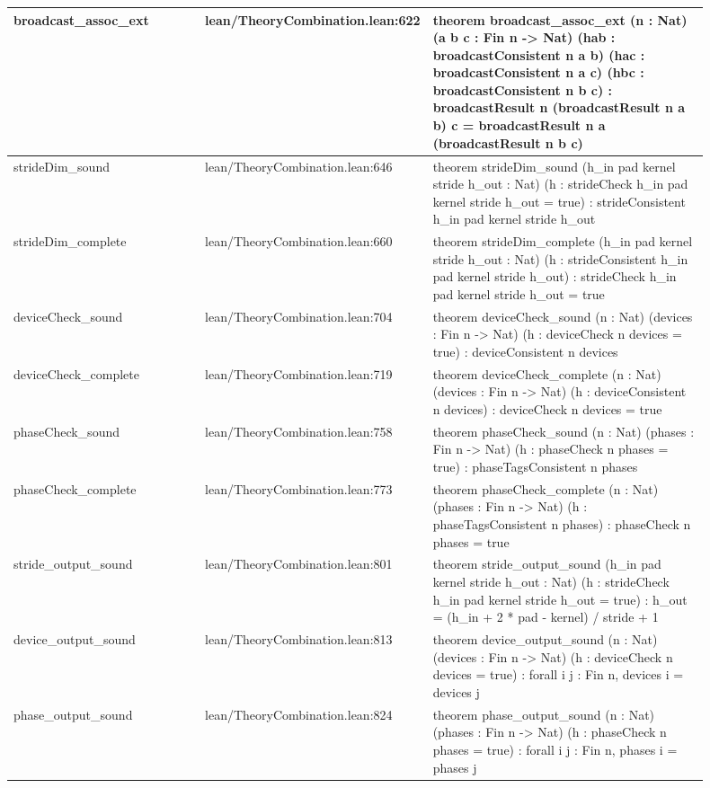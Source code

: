 \documentclass[10pt]{article}
\begin{document}
\begin{longtable}{|p{0.30\linewidth}|p{0.13\linewidth}|p{0.47\linewidth}|}
\hline
broadcast\_assoc\_ext & lean/TheoryCombination.lean:622 & theorem broadcast\_assoc\_ext (n : Nat) (a b c : Fin n -> Nat) (hab : broadcastConsistent n a b) (hac : broadcastConsistent n a c) (hbc : broadcastConsistent n b c) : broadcastResult n (broadcastResult n a b) c = broadcastResult n a (broadcastResult n b c) \\
\hline
strideDim\_sound & lean/TheoryCombination.lean:646 & theorem strideDim\_sound (h\_in pad kernel stride h\_out : Nat) (h : strideCheck h\_in pad kernel stride h\_out = true) : strideConsistent h\_in pad kernel stride h\_out \\
\hline
strideDim\_complete & lean/TheoryCombination.lean:660 & theorem strideDim\_complete (h\_in pad kernel stride h\_out : Nat) (h : strideConsistent h\_in pad kernel stride h\_out) : strideCheck h\_in pad kernel stride h\_out = true \\
\hline
deviceCheck\_sound & lean/TheoryCombination.lean:704 & theorem deviceCheck\_sound (n : Nat) (devices : Fin n -> Nat) (h : deviceCheck n devices = true) : deviceConsistent n devices \\
\hline
deviceCheck\_complete & lean/TheoryCombination.lean:719 & theorem deviceCheck\_complete (n : Nat) (devices : Fin n -> Nat) (h : deviceConsistent n devices) : deviceCheck n devices = true \\
\hline
phaseCheck\_sound & lean/TheoryCombination.lean:758 & theorem phaseCheck\_sound (n : Nat) (phases : Fin n -> Nat) (h : phaseCheck n phases = true) : phaseTagsConsistent n phases \\
\hline
phaseCheck\_complete & lean/TheoryCombination.lean:773 & theorem phaseCheck\_complete (n : Nat) (phases : Fin n -> Nat) (h : phaseTagsConsistent n phases) : phaseCheck n phases = true \\
\hline
stride\_output\_sound & lean/TheoryCombination.lean:801 & theorem stride\_output\_sound (h\_in pad kernel stride h\_out : Nat) (h : strideCheck h\_in pad kernel stride h\_out = true) : h\_out = (h\_in + 2 * pad - kernel) / stride + 1 \\
\hline
device\_output\_sound & lean/TheoryCombination.lean:813 & theorem device\_output\_sound (n : Nat) (devices : Fin n -> Nat) (h : deviceCheck n devices = true) : forall i j : Fin n, devices i = devices j \\
\hline
phase\_output\_sound & lean/TheoryCombination.lean:824 & theorem phase\_output\_sound (n : Nat) (phases : Fin n -> Nat) (h : phaseCheck n phases = true) : forall i j : Fin n, phases i = phases j \\

\end{longtable}
\end{document}
